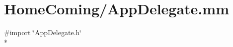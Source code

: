 \hypertarget{_app_delegate_8mm}{\section{Home\-Coming/\-App\-Delegate.mm}
\label{_app_delegate_8mm}
}
{\ttfamily \#import \char`\"{}App\-Delegate.\-h\char`\"{}}\\*
